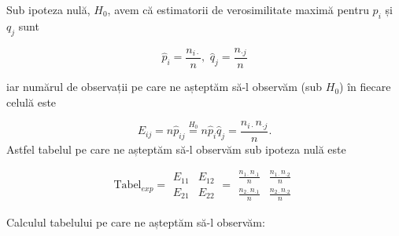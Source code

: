 \documentclass[]{article}
\begin{document}
Sub ipoteza nulă, \(H_0\), avem că estimatorii de verosimilitate maximă
pentru \(p_i\) și \(q_j\) sunt

\[
  \hat{p}_i = \frac{n_{i\cdot}}{n},\,\, \hat{q}_j = \frac{n_{\cdot j}}{n}
\]

iar numărul de observații pe care ne așteptăm să-l observăm (sub
\(H_0\)) în fiecare celulă este

\[
  E_{ij} = n \hat{p}_{ij} \overset{H_0}{=} n \hat{p}_i \hat{q}_j = \frac{n_{i\cdot}n_{\cdot j}}{n}.
\] Astfel tabelul pe care ne așteptăm să-l observăm sub ipoteza nulă
este

\[
  \text{Tabel}_{exp} = \begin{array}{c|c}
      E_{11} & E_{12}\\
      \hline
      E_{21} & E_{22}
  \end{array} = \begin{array}{c|c}
      \frac{n_{1\cdot}n_{\cdot 1}}{n} & \frac{n_{1\cdot}n_{\cdot 2}}{n}\\
      \hline
      \frac{n_{2\cdot}n_{\cdot 1}}{n} & \frac{n_{2\cdot}n_{\cdot 2}}{n}
  \end{array}
\]

Calculul tabelului pe care ne așteptăm să-l observăm:
\end{document}
